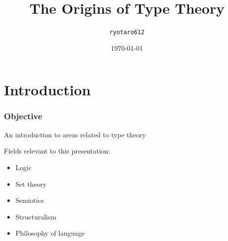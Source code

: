 \documentclass[unicode, 14pt, aspectratio=169]{beamer}
\date{\today}
\title{The Origins of Type Theory}
\author{\texttt{ryotaro612}}
\begin{document}
\begin{frame}
\titlepage
\end{frame}
\section{Introduction}
\begin{frame}
  \frametitle{Objective}
  {\large An introduction to areas related to type theory}
  \par
  \vspace{16pt}
  Fields relevant to this presentation:
  \begin{itemize}
  \item Logic
  \item Set theory
  \item Semiotics
  \item Structuralism
  \item Philosophy of language
  \end{itemize}
\end{frame}
\end{document}
